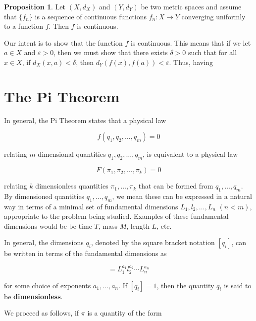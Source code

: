 \documentclass{article}
\makeatletter
\theoremstyle{definition}
\newtheorem{prop}{Proposition}[section]
\theoremstyle{remark}
\let\oldproofname=\proofname
\renewcommand{\proofname}{\bf{\textit{\oldproofname}}}
\theoremstyle{definition}
\renewenvironment{proof}[1][\proofname]{\par
  \pushQED{\qed}%
  \normalfont \topsep6\p@\@plus6\p@\relax
  \list{}{\leftmargin=0mm
          \rightmargin=0mm
          \settowidth{\itemindent}{\itshape#1}%
          \labelwidth=\itemindent
          \parsep=0pt \listparindent=0mm%
  }
  \item[\hskip\labelsep
        \itshape
    #1\@addpunct{.}]\ignorespaces
}{%
  \popQED\endlist\@endpefalse
}
\makeatother
\begin{document}
\begin{prop}
     Let $(X,d_X)$ and $(Y,d_Y)$ be two metric spaces and assume that $\{f_n\}$ is a sequence of continuous functions $f_n\colon X\rightarrow Y$ converging uniformly to a function $f$. Then $f$ is continuous.
\end{prop}

\begin{proof}
    Our intent is to show that the function $f$ is continuous. This means that if we let $a\in X$ and $\varepsilon>0$, then we must show that there exists $\delta>0$ such that for all $x\in X$, if $d_X(x,a)<\delta$, then $d_Y(f(x),f(a))<\varepsilon$. Thus, having
\end{proof}

\newpage

\section{The Pi Theorem}

In general, the Pi Theorem states that a physical law 

\begin{equation}
    f(q_1, q_2, \dots, q_m)=0
\end{equation}

\noindent relating $m$ dimensional quantities $q_1, q_2, \dots, q_m$, is equivalent to a physical law 

\begin{equation}
    F(\pi_1, \pi_2, \dots, \pi_k)=0
\end{equation}

\noindent relating $k$ dimensionless quantities $\pi_1, \dots, \pi_k$ that can be formed from $q_1, \dots, q_m$. By dimensioned quantities $q_1, \dots, q_m$, we mean these can be expressed in a natural way in terms of a minimal set of fundamental dimensions $L_1, l_2, \dots, L_n$ $(n<m)$, appropriate to the problem being studied. Examples of these fundamental dimensions would be be time $T$, mass $M$, length  $L$, etc.\par In general, the dimensions $q_i$, denoted by the square bracket notation $[q_i]$, can be written in terms of the fundamental dimensions as 

\begin{equation}
    [q_i]=L_1^{a_1}l_2^{a_2}\cdots L_n^{a_n}
\end{equation}

\noindent for some choice of exponents $a_1, \dots, a_n$. If $[q_i]=1$, then the quantity $q_i$ is said to be \textbf{dimensionless}.\par We proceed as follows, if $\pi$ is a quantity of the form 
\end{document}
